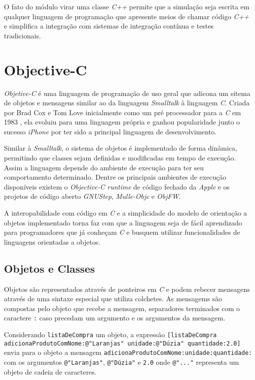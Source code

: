 O fato do módulo virar uma classe \emph{C++} permite que a simulação seja escrita
em qualquer linguagem de programação que apresente meios de chamar código \emph{C++}
e simplifica a integração com sistemas de integração 
contínua e testes tradicionais.

\newpage
\section{Objective-C}
\label{sec:ObjC}

\emph{Objetive-C} é uma linguagem de programação de uso geral que adicona um
sitema de objetos e mensagens similar ao da linguagem \emph{Smalltalk} à linguagem
\emph{C}. Criada por Brad Cox e Tom Love inicialmente como um pré processador
para a \emph{C} em 1983 \citep{OOPC}, ela evoluiu para uma linguagem própria
e ganhou popularidade junto o sucesso \emph{iPhone} por ter sido a 
principal linguagem de desenvolvimento.

Similar à \emph{Smalltalk}, o sistema de objetos é implementado de forma dinâmica,
permitindo que classes sejam definidas e modificadas em tempo de execução.
Assim a linguagem depende do ambiente de execução para ter seu comportamento
determinado. Dentre os principais ambientes de execução disponíveis existem o
\emph{Objective-C runtime} de código fechado da \emph{Apple} e os projetos
de código aberto \emph{GNUStep}, \emph{Mulle-Objc} e \emph{ObjFW}.

A interopabilidade com código em \emph{C} e a simplicidade do modelo
de orientação a objetos implementado torna faz com que a linguagem seja
de fácil aprendizado para programadores que já conheçam \emph{C} e busquem
utilizar funcionalidades de linguagens orientadas a objetos. 

\subsection{Objetos e Classes}
\label{sec:class}

Objetos são representados através de ponteiros em \emph{C} e podem
rebecer mensagens através de uma sintaxe especial que utiliza colchetes.
As mensagems são compostas pelo objeto que recebe a mensagem, separadores 
terminados com o caractere \texttt{:} caso precedam um argumento e os
argumentos da mensagem.

Considerando \texttt{listaDeCompra} um objeto, a expressão
\texttt{[listaDeCompra adicionaProdutoComNome:@"Laranjas" unidade:@"Dúzia" quantidade:2.0]}
envia para o objeto a mensagem \texttt{adicionaProdutoComNome:unidade:quantidade:} com os argumentos
\texttt{@"Laranjas"}, \texttt{@"Dúzia"} e \texttt{2.0} onde \texttt{@"..."} representa um objeto de
cadeia de caracteres.

